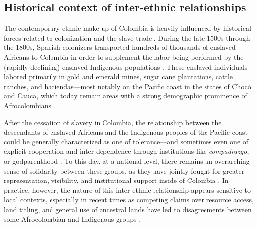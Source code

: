 \documentclass[bibauthoryear]{aa}
\begin{document}
\subsection{Historical context of inter-ethnic relationships}
The contemporary ethnic make-up of Colombia is heavily influenced by historical forces related to colonization and the slave trade \citep{Can00, wade2002introduction, castillo2009discourse}.  During the late 1500s through the 1800s, Spanish colonizers transported hundreds of thousands of enslaved Africans to Colombia in order to supplement the labor being performed by the (rapidly declining)  enslaved Indigenous populations \citep{slavenote, gilbertomurillo2001el}. 
 These enslaved individuals labored primarily in gold and emerald mines, sugar cane plantations, cattle ranches, and haciendas---most notably on the Pacific coast in the states of Choc\'o and Cauca, which today remain areas with a strong demographic prominence of Afrocolombians \citep{gilbertomurillo2001el, wade2002introduction}. 

After the cessation of slavery in Colombia, the relationship between the descendants of enslaved Africans and the Indigenous peoples  of the Pacific coast could be generally characterized as one of tolerance---and sometimes even one of explicit cooperation and inter-dependence through institutions like \textit{compadrazgo}, or godparenthood \citep{Cay73}. To this day, at a national level, there remains an overarching sense of solidarity between these groups, as they have jointly fought for greater representation, visibility, and institutional support inside of Colombia \citep{castillo2009discourse, iglesiasvoces}. In practice, however, the nature of this inter-ethnic relationship appears sensitive to local contexts, especially in recent times as competing claims over resource access, land titling, and general use of ancestral lands have led to disagreements between some Afrocolombian and Indigenous groups \citep{ng2000titling, davis2002indigenous, garcia2009diversos, velasco2011contested}. 
 
\end{document}
